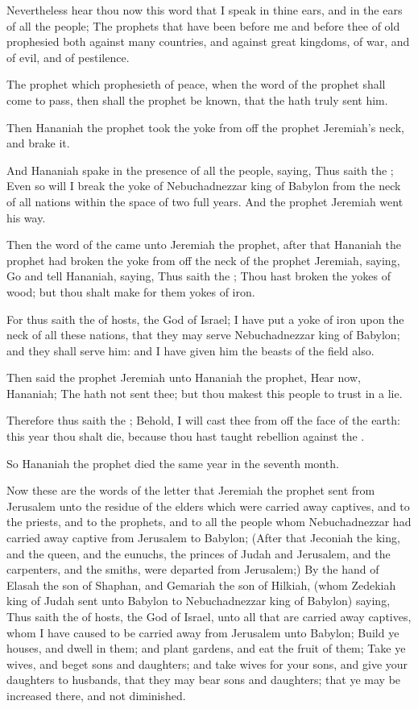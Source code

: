 \Verse Nevertheless hear thou now this word that I speak in thine ears, and in the ears of all the people; \Verse The prophets that have been before me and before thee of old prophesied both against many countries, and against great kingdoms, of war, and of evil, and of pestilence.

\Verse The prophet which prophesieth of peace, when the word of the prophet shall come to pass, then shall the prophet be known, that the \LORD hath truly sent him.

\Verse Then Hananiah the prophet took the yoke from off the prophet Jeremiah's neck, and brake it.

\Verse And Hananiah spake in the presence of all the people, saying, Thus saith the \LORD; Even so will I break the yoke of Nebuchadnezzar king of Babylon from the neck of all nations within the space of two full years. And the prophet Jeremiah went his way.

\Verse Then the word of the \LORD came unto Jeremiah the prophet, after that Hananiah the prophet had broken the yoke from off the neck of the prophet Jeremiah, saying, \Verse Go and tell Hananiah, saying, Thus saith the \LORD; Thou hast broken the yokes of wood; but thou shalt make for them yokes of iron.

\Verse For thus saith the \LORD of hosts, the God of Israel; I have put a yoke of iron upon the neck of all these nations, that they may serve Nebuchadnezzar king of Babylon; and they shall serve him: and I have given him the beasts of the field also.

\Verse Then said the prophet Jeremiah unto Hananiah the prophet, Hear now, Hananiah; The \LORD hath not sent thee; but thou makest this people to trust in a lie.

\Verse Therefore thus saith the \LORD; Behold, I will cast thee from off the face of the earth: this year thou shalt die, because thou hast taught rebellion against the \LORD.

\Verse So Hananiah the prophet died the same year in the seventh month.


\Chapter
\Verse Now these are the words of the letter that Jeremiah the prophet sent from Jerusalem unto the residue of the elders which were carried away captives, and to the priests, and to the prophets, and to all the people whom Nebuchadnezzar had carried away captive from Jerusalem to Babylon; \Verse (After that Jeconiah the king, and the queen, and the eunuchs, the princes of Judah and Jerusalem, and the carpenters, and the smiths, were departed from Jerusalem;) \Verse By the hand of Elasah the son of Shaphan, and Gemariah the son of Hilkiah, (whom Zedekiah king of Judah sent unto Babylon to Nebuchadnezzar king of Babylon) saying, \Verse Thus saith the \LORD of hosts, the God of Israel, unto all that are carried away captives, whom I have caused to be carried away from Jerusalem unto Babylon; \Verse Build ye houses, and dwell in them; and plant gardens, and eat the fruit of them; \Verse Take ye wives, and beget sons and daughters; and take wives for your sons, and give your daughters to husbands, that they may bear sons and daughters; that ye may be increased there, and not diminished.

